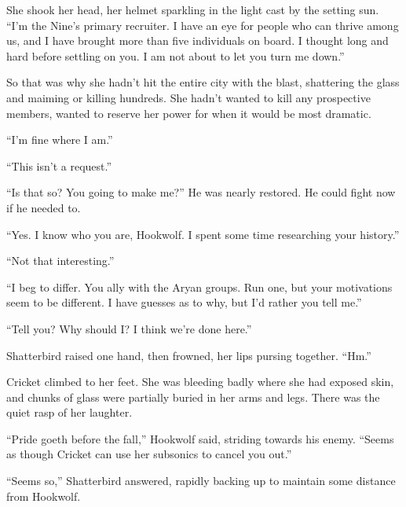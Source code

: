 She shook her head, her helmet sparkling in the light cast by the setting sun.  ``I'm the Nine's primary recruiter.  I have an eye for people who can thrive among us, and I have brought more than five individuals on board.  I thought long and hard before settling on you.  I am not about to let you turn me down.''



So that was why she hadn't hit the entire city with the blast, shattering the glass and maiming or killing hundreds.  She hadn't wanted to kill any prospective members, wanted to reserve her power for when it would be most dramatic.



``I'm fine where I am.''



``This isn't a request.''



``Is that so?  You going to make me?''  He was nearly restored.  He could fight now if he needed to.



``Yes.  I know who you are, Hookwolf.  I spent some time researching your history.''



``Not that interesting.''



``I beg to differ.  You ally with the Aryan groups.  Run one, but your motivations seem to be different.  I have guesses as to why, but I'd rather you tell me.''



``Tell you?  Why should I?  I think we're done here.''



Shatterbird raised one hand, then frowned, her lips pursing together.  ``Hm.''



Cricket climbed to her feet.  She was bleeding badly where she had exposed skin, and chunks of glass were partially buried in her arms and legs.  There was the quiet rasp of her laughter.



``Pride goeth before the fall,'' Hookwolf said, striding towards his enemy.  ``Seems as though Cricket can use her subsonics to cancel you out.''



``Seems so,'' Shatterbird answered, rapidly backing up to maintain some distance from Hookwolf.



